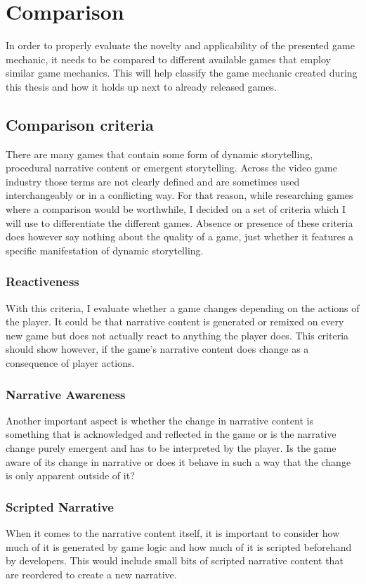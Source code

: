 \chapter{Comparison} %
In order to properly evaluate the novelty and applicability of the presented game mechanic, it needs to be compared to different available games that employ similar game mechanics. This will help classify the game mechanic created during this thesis and how it holds up next to already released games.
\section{Comparison criteria}
There are many games that contain some form of dynamic storytelling, procedural narrative content or emergent storytelling. Across the video game industry those terms are not clearly defined and are sometimes used interchangeably or in a conflicting way. For that reason, while researching games where a comparison would be worthwhile, I decided on a set of criteria which I will use to differentiate the different games. Absence or presence of these criteria does however say nothing about the quality of a game, just whether it features a specific manifestation of dynamic storytelling.
\subsection{Reactiveness}
With this criteria, I evaluate whether a game changes depending on the actions of the player. It could be that narrative content is generated or remixed on every new game but does not actually react to anything the player does. This criteria should show however, if the game's narrative content does change as a consequence of player actions.
\subsection{Narrative Awareness}
Another important aspect is whether the change in narrative content is something that is acknowledged and reflected in the game or is the narrative change purely emergent and has to be interpreted by the player. Is the game aware of its change in narrative or does it behave in such a way that the change is only apparent outside of it?
\subsection{Scripted Narrative}
When it comes to the narrative content itself, it is important to consider how much of it is generated by game logic and how much of it is scripted beforehand by developers. This would include small bits of scripted narrative content that are reordered to create a new narrative.
